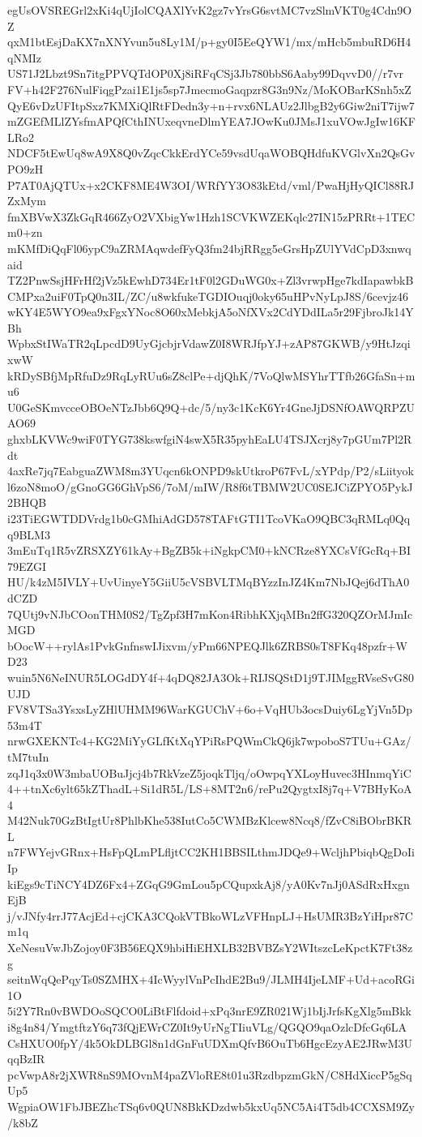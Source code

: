 egUsOVSREGrl2xKi4qUjIolCQAXlYvK2gz7vYrsG6svtMC7vzSlmVKT0g4Cdn9OZ
qxM1btEsjDaKX7nXNYvun5u8Ly1M/p+gy0I5EeQYW1/mx/mHcb5mbuRD6H4qNMIz
US71J2Lbzt9Sn7itgPPVQTdOP0Xj8iRFqCSj3Jb780bbS6Aaby99DqvvD0//r7vr
FV+h42F276NulFiqgPzai1E1js5sp7JmecmoGaqpzr8G3n9Nz/MoKOBarKSnh5xZ
QyE6vDzUFItpSxz7KMXiQlRtFDedn3y+n+rvx6NLAUz2JlbgB2y6Giw2niT7ijw7
mZGEfMLlZYsfmAPQfCthINUxeqvneDlmYEA7JOwKu0JMsJ1xuVOwJgIw16KFLRo2
NDCF5tEwUq8wA9X8Q0vZqcCkkErdYCe59vsdUqaWOBQHdfuKVGlvXn2QsGvPO9zH
P7AT0AjQTUx+x2CKF8ME4W3OI/WRfYY3O83kEtd/vml/PwaHjHyQICl88RJZxMym
fmXBVwX3ZkGqR466ZyO2VXbigYw1Hzh1SCVKWZEKqlc27IN15zPRRt+1TECm0+zn
mKMfDiQqFl06ypC9aZRMAqwdefFyQ3fm24bjRRgg5eGrsHpZUlYVdCpD3xnwqaid
TZ2PnwSsjHFrHf2jVz5kEwhD734Er1tF0l2GDuWG0x+Zl3vrwpHge7kdIapawbkB
CMPxa2uiF0TpQ0n3IL/ZC/u8wkfukeTGDIOuqj0oky65uHPvNyLpJ8S/6cevjz46
wKY4E5WYO9ea9xFgxYNoc8O60xMebkjA5oNfXVx2CdYDdILa5r29FjbroJk14YBh
WpbxStIWaTR2qLpcdD9UyGjcbjrVdawZ0I8WRJfpYJ+zAP87GKWB/y9HtJzqixwW
kRDySBfjMpRfuDz9RqLyRUu6sZ8clPe+djQhK/7VoQlwMSYhrTTfb26GfaSn+mu6
U0GeSKmvcceOBOeNTzJbb6Q9Q+dc/5/ny3c1KcK6Yr4GneJjDSNfOAWQRPZUAO69
ghxbLKVWc9wiF0TYG738kswfgiN4swX5R35pyhEaLU4TSJXcrj8y7pGUm7Pl2Rdt
4axRe7jq7EabguaZWM8m3YUqcn6kONPD9skUtkroP67FvL/xYPdp/P2/sLiityok
l6zoN8moO/gGnoGG6GhVpS6/7oM/mIW/R8f6tTBMW2UC0SEJCiZPYO5PykJ2BHQB
i23TiEGWTDDVrdg1b0cGMhiAdGD578TAFtGTI1TcoVKaO9QBC3qRMLq0Qqq9BLM3
3mEuTq1R5vZRSXZY61kAy+BgZB5k+iNgkpCM0+kNCRze8YXCsVfGcRq+BI79EZGI
HU/k4zM5IVLY+UvUinyeY5GiiU5cVSBVLTMqBYzzInJZ4Km7NbJQej6dThA0dCZD
7QUtj9vNJbCOonTHM0S2/TgZpf3H7mKon4RibhKXjqMBn2ffG320QZOrMJmIcMGD
bOocW++rylAs1PvkGnfnswIJixvm/yPm66NPEQJlk6ZRBS0sT8FKq48pzfr+WD23
wuin5N6NeINUR5LOGdDY4f+4qDQ82JA3Ok+RIJSQStD1j9TJIMggRVseSvG80UJD
FV8VTSa3YsxsLyZHlUHMM96WarKGUChV+6o+VqHUb3ocsDuiy6LgYjVn5Dp53m4T
nrwGXEKNTc4+KG2MiYyGLfKtXqYPiRsPQWmCkQ6jk7wpoboS7TUu+GAz/tM7tuIn
zqJ1q3x0W3mbaUOBuJjcj4b7RkVzeZ5joqkTljq/oOwpqYXLoyHuvec3HInmqYiC
4++tnXc6ylt65kZThadL+Si1dR5L/LS+8MT2n6/rePu2QygtxI8j7q+V7BHyKoA4
M42Nuk70GzBtIgtUr8PhlbKhe538IutCo5CWMBzKlcew8Ncq8/fZvC8iBObrBKRL
n7FWYejvGRnx+HsFpQLmPLfljtCC2KH1BBSILthmJDQe9+WcljhPbiqbQgDoIiIp
kiEgs9cTiNCY4DZ6Fx4+ZGqG9GmLou5pCQupxkAj8/yA0Kv7nJj0ASdRxHxgnEjB
j/vJNfy4rrJ77AcjEd+cjCKA3CQokVTBkoWLzVFHnpLJ+HsUMR3BzYiHpr87Cm1q
XeNesuVwJbZojoy0F3B56EQX9hbiHiEHXLB32BVBZsY2WItszcLeKpctK7Ft38zg
seitnWqQePqyTs0SZMHX+4IcWyylVnPcIhdE2Bu9/JLMH4IjeLMF+Ud+acoRGi1O
5i2Y7Rn0vBWDOoSQCO0LiBtFlfdoid+xPq3nrE9ZR021Wj1bIjJrfsKgXlg5mBkk
i8g4n84/YmgtftzY6q73fQjEWrCZ0It9yUrNgTIiuVLg/QGQO9qaOzlcDfcGq6LA
CsHXUO0fpY/4k5OkDLBGl8n1dGnFuUDXmQfvB6OuTb6HgcEzyAE2JRwM3UqqBzIR
pcVwpA8r2jXWR8nS9MOvnM4paZVloRE8t01u3RzdbpzmGkN/C8HdXiccP5gSqUp5
WgpiaOW1FbJBEZhcTSq6v0QUN8BkKDzdwb5kxUq5NC5Ai4T5db4CCXSM9Zy/k8bZ
